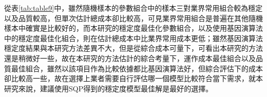 從表\ref{tab:table9}中，雖然隨機樣本的參數組合中的樣本三對業界常用組合較為穩定以及品質較高，但單次估計總成本卻比較高，可見業界常用組合是普遍在其他隨機樣本中確實是比較好的，而本研究的穩定度最佳化參數組合，以及使用基因演算法中的穩定度最佳化組合，則在估計總成本中比業界常用成本更低；雖然基因演算法穩定度結果與本研究方法差異不大，但是從綜合成本可量下，可看出本研究的方法還是稍微好一些，故在本研究的方法估計的綜合考量下，運作成本最佳組合以及品質最佳組合，雖然以該項目作為比較依據都比基因演算法好，但綜合評估下的成本卻比較高一些，故在選擇上業者需要自行評估哪一個模型比較符合當下需求，就本研究來說，建議使用SQP得到的穩定度模型最佳解是最好的選擇。
